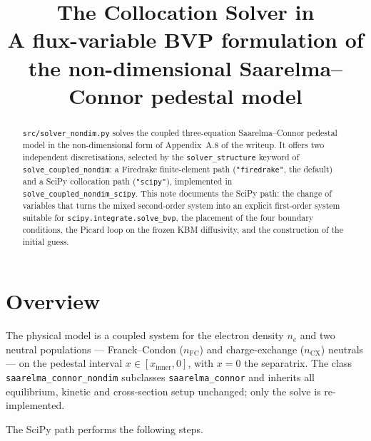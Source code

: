 \documentclass[11pt]{article}
\title{The \code{scipy} Collocation Solver in \code{src/solver\_nondim.py}\\
       \large A flux-variable BVP formulation of the non-dimensional
       Saarelma--Connor pedestal model}
\author{}
\date{}
\newcommand{\code}[1]{\texttt{#1}}
\begin{document}
\maketitle

\begin{abstract}
\code{src/solver\_nondim.py} solves the coupled three-equation
Saarelma--Connor pedestal model in the non-dimensional form of
Appendix~A.8 of the writeup.  It offers two independent discretisations,
selected by the \code{solver\_structure} keyword of
\code{solve\_coupled\_nondim}: a Firedrake finite-element path
(\code{"firedrake"}, the default) and a SciPy collocation path
(\code{"scipy"}), implemented in
\code{solve\_coupled\_nondim\_scipy}.  This note documents the SciPy
path: the change of variables that turns the mixed second-order system
into an explicit first-order system suitable for
\code{scipy.integrate.solve\_bvp}, the placement of the four boundary
conditions, the Picard loop on the frozen KBM diffusivity, and the
construction of the initial guess.
\end{abstract}

\tableofcontents

\section{Overview}

The physical model is a coupled system for the electron density $n_e$ and
two neutral populations --- Franck--Condon ($n_{\mathrm{FC}}$) and
charge-exchange ($n_{\mathrm{CX}}$) neutrals --- on the pedestal interval
$x \in [x_{\mathrm{inner}}, 0]$, with $x = 0$ the separatrix.  The class
\code{saarelma\_connor\_nondim} subclasses \code{saarelma\_connor} and
inherits all equilibrium, kinetic and cross-section setup unchanged; only
the solve is re-implemented.

The SciPy path performs the following steps.
\end{document}
